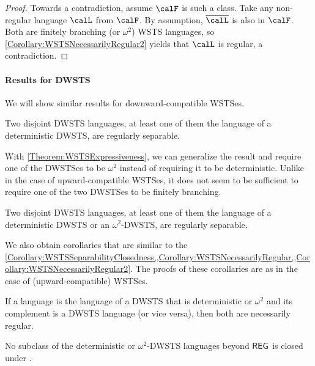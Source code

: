 \documentclass[../../diss.tex]{subfiles}
\begin{document}
\begin{proof}
    Towards a contradiction, assume $\calF$ is such a class.
    Take any non-regular language $\calL$ from $\calF$.
    By assumption, $\overline{\calL}$ is also in $\calF$.
    Both are finitely branching (or $\omega^2$) WSTS languages, so \cref{Corollary:WSTSNecessarilyRegular2} yields that $\calL$ is regular, a contradiction.
\end{proof}

\paragraph{Results for DWSTS}

We will show similar results for downward-compatible WSTSes.

\begin{theorem}%
\label{Theorem:DWSTSSeparability}%
    Two disjoint DWSTS languages, at least one of them the language of a deterministic DWSTS, are regularly separable.
\end{theorem}

With \cref{Theorem:WSTSExpressiveness}, we can generalize the result and require one of the DWSTSes to be $\omega^2$ instead of requiring it to be deterministic.
Unlike in the case of upward-compatible WSTSes, it does not seem to be sufficient to require one of the two DWSTSes to be finitely branching.

\begin{corollary}
    Two disjoint DWSTS languages, at least one of them the language of a deterministic DWSTS or an $\omega^2$-DWSTS, are regularly separable.
\end{corollary}

We also obtain corollaries that are similar to the \cref{Corollary:WSTSSeparabilityClosedness,,Corollary:WSTSNecessarilyRegular,,Corollary:WSTSNecessarilyRegular2}.
The proofs of these corollaries are as in the case of (upward-compatible) WSTSes.

\begin{corollary}
    \begin{thmenumerate}[a)]
        \item If a language is the language of a DWSTS that is deterministic or $\omega^2$ and its complement is a DWSTS language (or vice versa), then both are necessarily regular.
        \item
        No subclass of the deterministic or $\omega^2$-DWSTS languages beyond ${\mathsf{REG}}$ is closed under .
    \end{thmenumerate}
\end{corollary}
\end{document}
